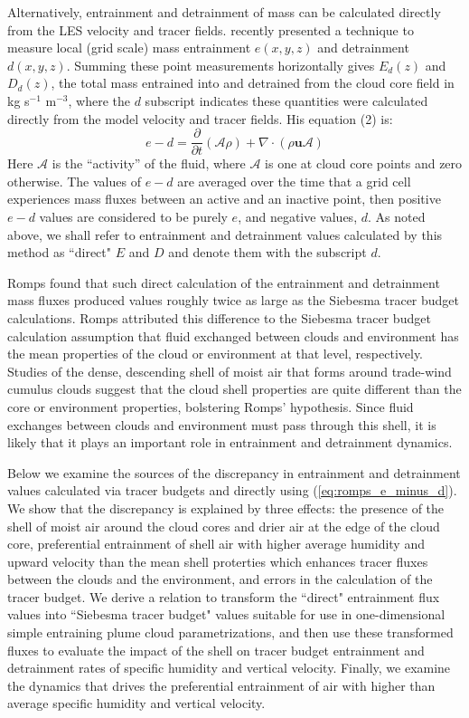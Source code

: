 \documentclass[12pt]{article}
\begin{document}
Alternatively, entrainment and detrainment of mass can be calculated directly
from the LES velocity and tracer fields.  \cite{Romps2010} recently presented a 
technique to measure local (grid scale) mass entrainment $e(x,y,z)$ and
detrainment $d(x,y,z)$.  Summing these point measurements horizontally gives 
$E_d(z)$ and $D_d(z)$, the total mass entrained into and detrained from the
cloud core field in kg s$^{-1}$ m$^{-3}$, where the $d$ subscript indicates 
these quantities were calculated directly from the model velocity and tracer
fields.  His equation (2) is:
\begin{equation}
  \label{eq:romps_e_minus_d}
  e - d = \frac{\partial}{\partial t}(\mathcal{A}\rho) 
        + \nabla \cdot (\rho \mathbf{u} \mathcal{A}) 
\end{equation}
Here $\mathcal{A}$ is the ``activity'' of the fluid, where
$\mathcal{A}$ is one at cloud core points and zero otherwise.  The values of
$e - d$ are averaged over the time that a grid cell experiences mass
fluxes between an active and an inactive point, then positive $e-d$
values are considered to be purely $e$, and negative values, $d$.  As
noted above, we shall refer to entrainment and detrainment values
calculated by this method as ``direct" $E$ and $D$ and denote them
with the subscript $d$.

Romps found that such direct calculation of the entrainment and
detrainment mass fluxes produced values roughly twice as large as
the Siebesma tracer budget calculations.  Romps attributed this difference
to the Siebesma tracer budget calculation assumption that fluid exchanged 
between clouds and environment has the mean properties of the cloud or 
environment at that level, respectively.  Studies of the dense, descending 
shell of moist air that forms around trade-wind cumulus clouds 
\citep{Jonas1990, Rodts2003, Heus2008, Jonker2008, Heus2009, Wang2010} suggest 
that the cloud shell properties are quite different than the core or 
environment properties, bolstering Romps' hypothesis.  Since fluid exchanges
between clouds and environment must pass through this shell, it is
likely that it plays an important role in entrainment and detrainment
dynamics.

Below we examine the sources of the discrepancy in entrainment and
detrainment values calculated via tracer budgets and directly
using (\ref{eq:romps_e_minus_d}).  We show that the discrepancy is explained by 
three effects: the presence of the shell of moist air around the cloud cores
and drier air at the edge of the cloud core, preferential entrainment of shell 
air with higher average humidity and upward velocity than the mean shell 
proterties which enhances tracer fluxes between the clouds and the environment, 
and errors in the calculation of the tracer budget.  We derive a relation 
to transform the ``direct" entrainment flux values into ``Siebesma tracer 
budget" values suitable for use in one-dimensional simple entraining plume
cloud parametrizations, and then use these transformed fluxes to
evaluate the impact of the shell on tracer budget entrainment and
detrainment rates of specific humidity and vertical velocity.  Finally, we
examine the dynamics that drives the preferential entrainment of air with 
higher than average specific humidity and vertical velocity.
\end{document}
